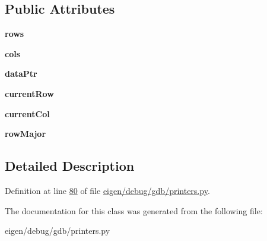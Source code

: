 \subsection*{Public Attributes}
\begin{DoxyCompactItemize}
\item 
\mbox{\label{classgdb_1_1printers_1_1_eigen_matrix_printer_1_1__iterator_acff03395eb53e1ef6d9f7eef1234bccc}} 
{\bfseries rows}
\item 
\mbox{\label{classgdb_1_1printers_1_1_eigen_matrix_printer_1_1__iterator_a3a335d95f1c2951d79e805be7df26456}} 
{\bfseries cols}
\item 
\mbox{\label{classgdb_1_1printers_1_1_eigen_matrix_printer_1_1__iterator_aab0f8a4a235788aa09f2d364361532dd}} 
{\bfseries data\+Ptr}
\item 
\mbox{\label{classgdb_1_1printers_1_1_eigen_matrix_printer_1_1__iterator_a2812e15ea77ca1bc412cef0f2d8e1d2b}} 
{\bfseries current\+Row}
\item 
\mbox{\label{classgdb_1_1printers_1_1_eigen_matrix_printer_1_1__iterator_a6160cf852602f8dfa421a64ebe9295cd}} 
{\bfseries current\+Col}
\item 
\mbox{\label{classgdb_1_1printers_1_1_eigen_matrix_printer_1_1__iterator_a0d116dd242972d7eda7e275bb7bd5c25}} 
{\bfseries row\+Major}
\end{DoxyCompactItemize}


\subsection{Detailed Description}


Definition at line \hyperlink{eigen_2debug_2gdb_2printers_8py_source_l00080}{80} of file \hyperlink{eigen_2debug_2gdb_2printers_8py_source}{eigen/debug/gdb/printers.\+py}.



The documentation for this class was generated from the following file\+:\begin{DoxyCompactItemize}
\item 
eigen/debug/gdb/printers.\+py\end{DoxyCompactItemize}
